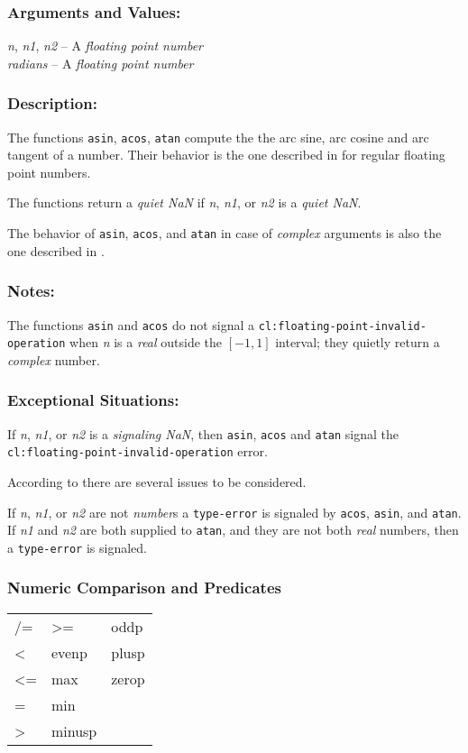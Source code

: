 \documentclass[10pt,fleqn]{article}
\newcommand{\code}[1]{\texttt{#1}}
\newcommand{\clieeeterm}[1]{\textit{#1}}
\newcommand{\varname}[1]{\textit{#1}}
\newcommand{\clterm}[1]{\textit{#1}}
\newcommand{\clname}[1]{\texttt{#1}}
\newcommand{\DArgsNValues}{\subsubsection*{Arguments and Values:}}
\newcommand{\DDescription}{\subsubsection*{Description:}}
\newcommand{\DExceptional}{\subsubsection*{Exceptional Situations:}}
\newcommand{\DNotes}{\subsubsection*{Notes:}}
\begin{document}
\DArgsNValues{}

\varname{n}, \varname{n1}, \varname{n2} -- A \clieeeterm{floating
  point number}\\
\varname{radians} -- A \clieeeterm{floating point number}

\DDescription{}

The functions \code{asin}, \code{acos}, \code{atan} compute the the
arc sine, arc cosine and arc tangent of a number.  Their behavior is
the one described in \cite{1996:ANSIHyperSpec} for regular floating point
numbers.

The functions return a \clieeeterm{quiet NaN} if \varname{n},
\varname{n1}, or \varname{n2} is a \clieeeterm{quiet NaN}.

The behavior of \code{asin}, \code{acos}, and \code{atan} in case of
\clterm{complex} arguments is also the one described in
\cite{1996:ANSIHyperSpec}.

\DNotes{}

The functions \code{asin} and \code{acos} do not signal a
\code{cl:floating-point-invalid-operation} when \varname{n} is a
\clterm{real} outside the $[-1, 1]$ interval; they quietly return a
\clterm{complex} number.

\DExceptional{}

If \varname{n}, \varname{n1}, or \varname{n2} is a
\clieeeterm{signaling NaN}, then \code{asin}, \code{acos} and
\code{atan} signal the\\
\clname{cl:floating-point-invalid-operation} error.

According to \cite{2008:IEEE-754} there are several issues to be
considered.

If \varname{n}, \varname{n1}, or \varname{n2} are not \clterm{number}s
a \code{type-error} is signaled by \code{acos}, \code{asin}, and
\code{atan}.  If \varname{n1} and \varname{n2} are both supplied to
\code{atan}, and they are not both \clterm{real} numbers, then a
\code{type-error} is signaled.


\newpage

\subsubsection*{Numeric Comparison and Predicates}

\begin{tt}
  \begin{tabular}{lll}
    /= &  >=     & oddp\\
    <  &  evenp  & plusp\\
    <= &  max    & zerop\\
    =  &  min    & \\
    >  &  minusp & \\
  \end{tabular}
\end{tt}
\end{document}
